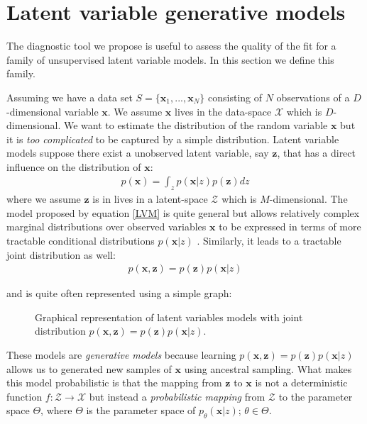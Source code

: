 \documentclass{article}
\newcommand{\x}{\mathbf{x}}
\newcommand{\z}{\mathbf{z}}
\begin{document}
\section{Latent variable generative models}

The diagnostic tool we propose is useful to assess the quality of the fit for a family of unsupervised latent variable models. In this section we define this family.

\bigskip

Assuming we have a data set $S= \{\mathbf{x}_1,...,\mathbf{x}_N\}$ consisting of $N$ observations of a $D$-dimensional variable $\mathbf{x}$. We assume $\x$ lives in the data-space $\mathcal{X}$ which is $D$-dimensional. We want to estimate the distribution of the random variable $\mathbf{x}$ but it is \textit{too complicated} to be captured by a simple distribution. Latent variable models suppose there exist a unobserved latent variable, say $\mathbf{z}$, that has a direct influence on the distribution of $\mathbf{x}$:
\begin{align}
p(\x) = \int_{z} p(\x|z)p(\z) dz
\label{LVM}
\end{align}
where we assume $\z$ is in lives in a latent-space $\mathcal{Z}$ which is $M$-dimensional. The model proposed by equation \ref{LVM} is quite general but allows relatively complex marginal distributions over observed variables $\mathbf{x}$ to be expressed in terms of more tractable conditional distributions $p(\x|z)$ \cite{Bishop07}. Similarly, it leads to a tractable joint distribution as well:
\begin{align}
p(\x,\z) = p(\z)p(\x|z)
\label{jointLVM}
\end{align}

and is quite often represented using a simple graph:
\begin{figure}[h!]
  \centering
  \caption{Graphical representation of latent variables models with joint distribution $p(\mathbf{x},\mathbf{z}) = p(\mathbf{z})p(\mathbf{x}|z)$.}
  \label{genny}
\end{figure}%
These models are \textit{generative models} because learning $p(\x,\z)= p(\z)p(\x|z)$ allows us to generated new samples of $\x$ using ancestral sampling. What makes this model probabilistic is that the mapping from $\z$
 to $\x$ is not a deterministic function $f: \mathcal{Z} \rightarrow \mathcal{X}$ but instead a \textit{probabilistic mapping} from $\mathcal{Z}$ to the parameter space $\Theta$, where $\Theta$ is the parameter space of $p_\theta(\x|z)$; $\theta \in \Theta$. 
 
\end{document}
